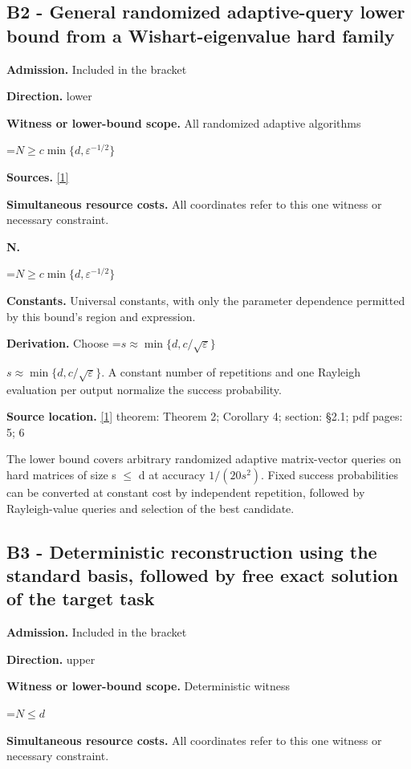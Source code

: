 \documentclass[10pt,a4paper]{article}
\newcommand{\AtlasMath}[1]{\par\begingroup\centering\setbox0=\hbox{$\displaystyle #1$}\ifdim\wd0>1.4\linewidth\typeout{ATLAS WIDE FORMULA: \the\wd0}\fi\ifdim\wd0>\linewidth\resizebox{\linewidth}{!}{\box0}\else\box0\fi\par\endgroup}
\newcommand{\AtlasInlineMath}[1]{\begingroup\setbox0=\hbox{$#1$}\ifdim\wd0>.4\linewidth\endgroup\AtlasMath{#1}\else\endgroup$#1$\fi}
\begin{document}
\subsection{B2 - General randomized adaptive-query lower bound from a Wishart-eigenvalue hard family}
\textbf{Admission.} Included in the bracket

\textbf{Direction.} lower

\textbf{Witness or lower-bound scope.} All randomized adaptive algorithms

\AtlasMath{N\ge c\min\{d,\varepsilon^{-1/2}\}}
\textbf{Sources.} \href{https://proceedings.mlr.press/v125/braverman20a/braverman20a.pdf}{[1]}

\textbf{Simultaneous resource costs.} All coordinates refer to this one witness or necessary constraint.

\textbf{N.}

\AtlasMath{N\ge c\min\{d,\varepsilon^{-1/2}\}}
\textbf{Constants.} Universal constants, with only the parameter dependence permitted by this bound’s region and expression.

\textbf{Derivation.} Choose \AtlasInlineMath{s\approx\min\{d,c/\sqrt{\varepsilon}\}}. A constant number of repetitions and one Rayleigh evaluation per output normalize the success probability.

\textbf{Source location.} \href{https://proceedings.mlr.press/v125/braverman20a/braverman20a.pdf}{[1]} theorem: Theorem 2; Corollary 4; section: §2.1; pdf pages: 5; 6

The lower bound covers arbitrary randomized adaptive matrix-vector queries on hard matrices of size s $\le$ d at accuracy $1/(20s^2)$. Fixed success probabilities can be converted at constant cost by independent repetition, followed by Rayleigh-value queries and selection of the best candidate.

\subsection{B3 - Deterministic reconstruction using the standard basis, followed by free exact solution of the target task}
\textbf{Admission.} Included in the bracket

\textbf{Direction.} upper

\textbf{Witness or lower-bound scope.} Deterministic witness

\AtlasMath{N\le d}
\textbf{Simultaneous resource costs.} All coordinates refer to this one witness or necessary constraint.
\end{document}
